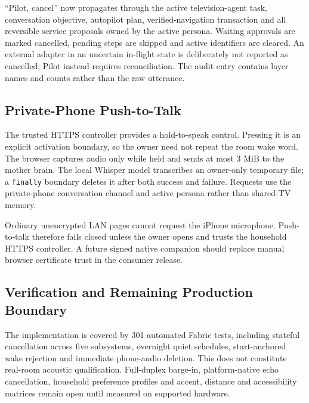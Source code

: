 ``Pilot, cancel'' now propagates through the active television-agent task,
conversation objective, autopilot plan, verified-navigation transaction and all
reversible service proposals owned by the active persona. Waiting approvals are
marked cancelled, pending steps are skipped and active identifiers are cleared.
An external adapter in an uncertain in-flight state is deliberately not reported
as cancelled; Pilot instead requires reconciliation. The audit entry contains
layer names and counts rather than the raw utterance.

\subsection{Private-Phone Push-to-Talk}

The trusted HTTPS controller provides a hold-to-speak control. Pressing it is an
explicit activation boundary, so the owner need not repeat the room wake word.
The browser captures audio only while held and sends at most 3 MiB to the mother
brain. The local Whisper model transcribes an owner-only temporary file; a
\texttt{finally} boundary deletes it after both success and failure. Requests use
the private-phone conversation channel and active persona rather than shared-TV
memory.

Ordinary unencrypted LAN pages cannot request the iPhone microphone. Push-to-talk
therefore fails closed unless the owner opens and trusts the household HTTPS
controller. A future signed native companion should replace manual browser
certificate trust in the consumer release.

\subsection{Verification and Remaining Production Boundary}

The implementation is covered by 301 automated Fabric tests, including stateful
cancellation across five subsystems, overnight quiet schedules, start-anchored
wake rejection and immediate phone-audio deletion. This does not constitute
real-room acoustic qualification. Full-duplex barge-in, platform-native echo
cancellation, household preference profiles and accent, distance and
accessibility matrices remain open until measured on supported hardware.
